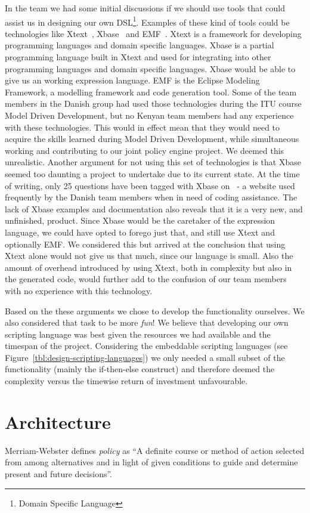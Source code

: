 In the team we had some initial discussions if we should use tools that could assist us in designing our own DSL\footnote{Domain Specific Language}. Examples of these kind of tools could be technologies like Xtext~\cite{xtext}, Xbase~\cite{xbase} and EMF~\cite{emf}. Xtext is a framework for developing programming languages and domain specific languages. Xbase is a partial programming language built in Xtext and used for integrating into other programming languages and domain specific languages. Xbase would be able to give us an working expression language. EMF is the Eclipse Modeling Framework, a modelling framework and code generation tool. Some of the team members in the Danish group had used those technologies during the ITU course Model Driven Development, but no Kenyan team members had any experience with these technologies. This would in effect mean that they would need to acquire the skills learned during Model Driven Development, while simultaneous working and contributing to our joint policy engine project. We deemed this unrealistic. Another argument for not using this set of technologies is that Xbase seemed too daunting a project to undertake due to its current state. At the time of writing, only 25 questions have been tagged with Xbase on~\cite{stackoverflow} - a website used frequently by the Danish team members when in need of coding assistance. The lack of Xbase examples and documentation also reveals that it is a very new, and unfinished, product. Since Xbase would be the caretaker of the expression language, we could have opted to forego just that, and still use Xtext and optionally EMF. We considered this but arrived at the conclusion that using Xtext alone would not give us that much, since our language is small. Also the amount of overhead introduced by using Xtext, both in complexity but also in the generated code, would further add to the confusion of our team members with no experience with this technology. 

Based on the these arguments we chose to develop the functionality ourselves. We also considered that task to be more \textit{fun}! We believe that developing our own scripting language was best given the resources we had available and the timespan of the project. Considering the embeddable scripting languages (see Figure~\ref{tbl:design-scripting-languages}) we only needed a small subset of the functionality (mainly the if-then-else construct) and therefore deemed the complexity versus the timewise return of investment unfavourable.

\section{Architecture}
Merriam-Webster defines \textit{policy} as ``A definite course or method of action selected from among alternatives and in light of given conditions to guide and determine present and future decisions''.

